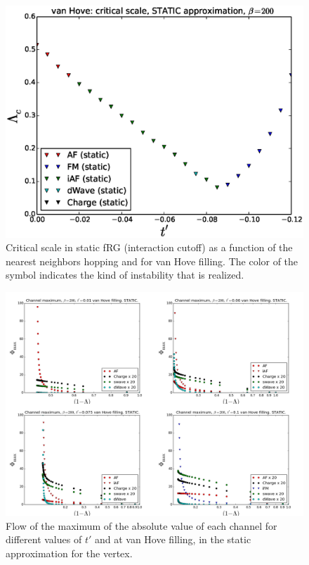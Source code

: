 \begin{figure}
\includegraphics[scale=0.7]{images/vanHove_scan_critical_lambda_phiSTATIC.eps}
\caption{Critical scale in static fRG (interaction cutoff) as a function of the nearest neighbors hopping and for van Hove filling. The color of the symbol indicates the kind of instability that is realized.} 
\label{phasediag_van_hoveSTATIC} 
\end{figure}


\begin{figure}
\includegraphics[scale=0.32,angle = 90]{images/static.png}
\caption{Flow of the maximum of the absolute value of each channel for different values of $t'$ and at van Hove filling, in the static approximation for the vertex.
} 
\label{lamstatic} 
\end{figure}


